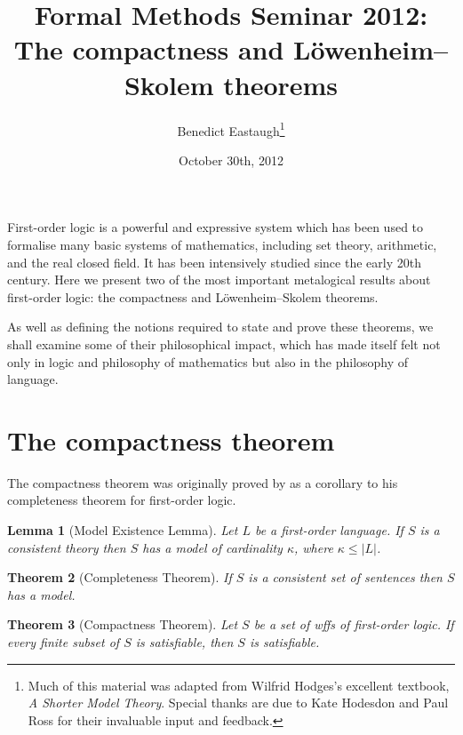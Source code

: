 \documentclass[10pt, a4paper, oneside]{article}
\title{Formal Methods Seminar 2012:\\
       The compactness and Löwenheim--Skolem theorems}
\author{Benedict Eastaugh\footnote{Much of this material was adapted from
        Wilfrid Hodges's excellent textbook, \emph{A Shorter Model Theory}.
        Special thanks are due to Kate Hodesdon and Paul Ross for their
        invaluable input and feedback.}}
\date{October 30th, 2012}
\newtheorem{thm}{Theorem}[section]
\theoremstyle{definition}
\theoremstyle{remark}
\theoremstyle{plain}
\newtheorem{lem}[thm]{Lemma}
\theoremstyle{plain}
\begin{document}
\maketitle

First-order logic is a powerful and expressive system which has been used to
formalise many basic systems of mathematics, including set theory, arithmetic,
and the real closed field. It has been intensively studied since the early 20th
century. Here we present two of the most important metalogical results about
first-order logic: the compactness and Löwenheim--Skolem theorems.

As well as defining the notions required to state and prove these theorems, we
shall examine some of their philosophical impact, which has made itself felt not
only in logic and philosophy of mathematics but also in the philosophy of
language.


\section{The compactness theorem}

The compactness theorem was originally proved by \citet{godel1930} as a
corollary to his completeness theorem for first-order logic.

\begin{lem}[Model Existence Lemma]
    \label{lem:model_existence}
    Let $L$ be a first-order language. If $S$ is a consistent theory then $S$
    has a model of cardinality $\kappa$, where $\kappa \leq |L|$.
\end{lem}

\begin{thm}[Completeness Theorem]
    \label{thm:completeness}
    If $S$ is a consistent set of sentences then $S$ has a model.
\end{thm}

\begin{thm}[Compactness Theorem]
    \label{compactness}
    Let $S$ be a set of wffs of first-order logic. If every finite subset of $S$
    is satisfiable, then $S$ is satisfiable.
\end{thm}
\end{document}
